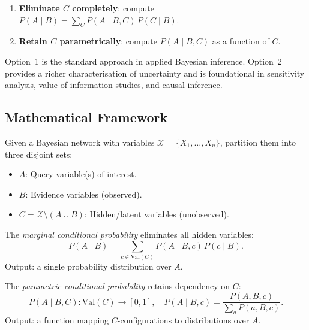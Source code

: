 \begin{enumerate}
    \item \textbf{Eliminate $C$ completely}: compute $P(A\mid B)=\sum_C P(A\mid B,C)\,P(C\mid B)$.
    \item \textbf{Retain $C$ parametrically}: compute $P(A\mid B,C)$ as a
          function of $C$.
\end{enumerate}

Option~1 is the standard approach in applied Bayesian inference. Option~2
provides a richer characterisation of uncertainty and is foundational in
sensitivity analysis, value-of-information studies, and causal inference.

\subsection{Mathematical Framework}

\begin{definition}
Given a Bayesian network with variables $\mathcal{X}=\{X_1,\ldots,X_n\}$,
partition them into three disjoint sets:
\begin{itemize}
    \item $A$: Query variable(s) of interest.
    \item $B$: Evidence variables (observed).
    \item $C=\mathcal{X}\setminus(A\cup B)$: Hidden/latent variables
          (unobserved).
\end{itemize}
\end{definition}

\begin{definition}
The \emph{marginal conditional probability} eliminates all hidden variables:
\begin{equation}
P(A\mid B)=\sum_{c\in\mathrm{Val}(C)} P(A\mid B,c)\,P(c\mid B).
\end{equation}
Output: a single probability distribution over $A$.
\end{definition}

\begin{definition}
The \emph{parametric conditional probability} retains dependency on $C$:
\begin{equation}
P(A\mid B,C):\mathrm{Val}(C)\to[0,1],\quad
P(A\mid B,c)=\frac{P(A,B,c)}{\sum_{a}P(a,B,c)}.
\end{equation}
Output: a function mapping $C$-configurations to distributions over $A$.
\end{definition}

